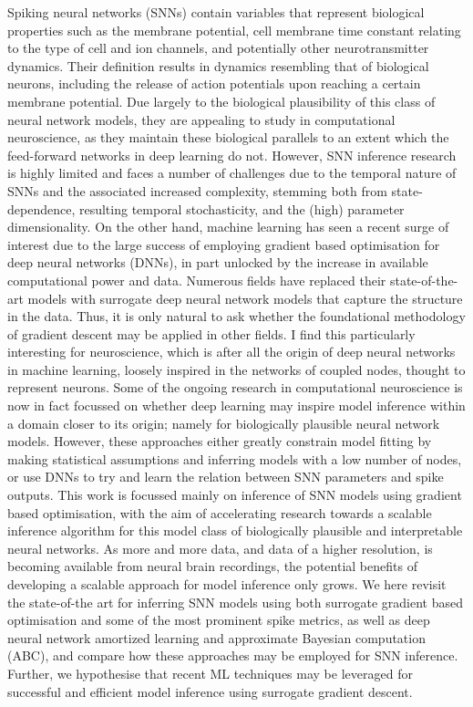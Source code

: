 \documentclass[mphil,deptreport,ianc]{infthesis} %
\begin{document}
Spiking neural networks (SNNs) contain variables that represent biological properties such as the membrane potential, cell membrane time constant relating to the type of cell and ion channels, and potentially other neurotransmitter dynamics. 
Their definition results in dynamics resembling that of biological neurons, including the release of action potentials upon reaching a certain membrane potential.
Due largely to the biological plausibility of this class of neural network models, they are appealing to study in computational neuroscience, as they maintain these biological parallels to an extent which the feed-forward networks in deep learning do not.
However, SNN inference research is highly limited and faces a number of challenges due to the temporal nature of SNNs and the associated increased complexity, stemming both from state-dependence, resulting temporal stochasticity, and the (high) parameter dimensionality.
On the other hand, machine learning has seen a recent surge of interest due to the large success of employing gradient based optimisation for deep neural networks (DNNs), in part unlocked by the increase in available computational power and data. 
Numerous fields have replaced their state-of-the-art models with surrogate deep neural network models that capture the structure in the data.
Thus, it is only natural to ask whether the foundational methodology of gradient descent may be applied in other fields.
I find this particularly interesting for neuroscience, which is after all the origin of deep neural networks in machine learning, loosely inspired in the networks of coupled nodes, thought to represent neurons.
Some of the ongoing research in computational neuroscience is now in fact focussed on whether deep learning may inspire model inference within a domain closer to its origin; namely for biologically plausible neural network models.
However, these approaches either greatly constrain model fitting by making statistical assumptions and inferring models with a low number of nodes, or use DNNs to try and learn the relation between SNN parameters and spike outputs.
This work is focussed mainly on inference of SNN models using gradient based optimisation, with the aim of accelerating research towards a scalable inference algorithm for this model class of biologically plausible and interpretable neural networks.
As more and more data, and data of a higher resolution, is becoming available from neural brain recordings, the potential benefits of developing a scalable approach for model inference only grows.
We here revisit the state-of-the art for inferring SNN models using both surrogate gradient based optimisation and some of the most prominent spike metrics, as well as deep neural network amortized learning and approximate Bayesian computation (ABC), and compare how these approaches may be employed for SNN inference. Further, we hypothesise that recent ML techniques may be leveraged for successful and efficient model inference using surrogate gradient descent.
\end{document}
